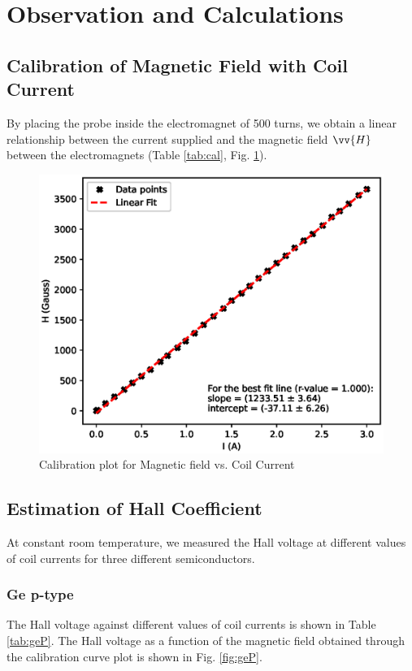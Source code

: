 \section{Observation and Calculations}

\subsection{Calibration of Magnetic Field with Coil Current}
By placing the probe inside the electromagnet of 500 turns, we obtain a linear relationship between the current supplied and the magnetic field $\vv{H}$ between the electromagnets (Table \ref{tab:cal}, Fig. \ref{calf}).


\begin{figure}[H]
    \centering
    \includegraphics[width=1\columnwidth]{images/cal.eps}
    \caption{Calibration plot for Magnetic field vs. Coil Current}
    \label{calf}
\end{figure}

\subsection{Estimation of Hall Coefficient}

At constant room temperature, we measured the Hall voltage at different values of coil currents for three different semiconductors.

\subsubsection{Ge p-type}
The Hall voltage against different values of coil currents is shown in Table \ref{tab:geP}. The Hall voltage as a function of the magnetic field obtained through the calibration curve plot is shown in Fig. \ref{fig:geP}.

